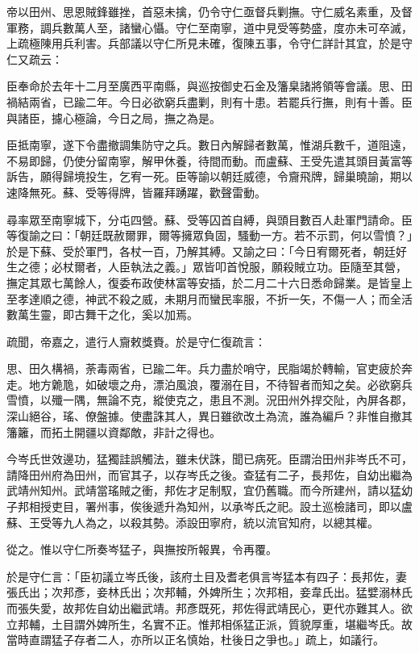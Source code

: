 \begin{pinyinscope}
帝以田州、思恩賊鋒雖挫，首惡未擒，仍令守仁亟督兵剿撫。守仁威名素重，及督軍務，調兵數萬人至，諸蠻心懾。守仁至南寧，道中見受等勢盛，度亦未可卒滅，上疏極陳用兵利害。兵部議以守仁所見未確，復陳五事，令守仁詳計其宜，於是守仁又疏云：

臣奉命於去年十二月至廣西平南縣，與巡按御史石金及籓臬諸將領等會議。思、田禍結兩省，已踰二年。今日必欲窮兵盡剿，則有十患。若罷兵行撫，則有十善。臣與諸臣，攄心極論，今日之局，撫之為是。

臣抵南寧，遂下令盡撤調集防守之兵。數日內解歸者數萬，惟湖兵數千，道阻遠，不易即歸，仍使分留南寧，解甲休養，待間而動。而盧蘇、王受先遣其頭目黃富等訴告，願得歸境投生，乞宥一死。臣等諭以朝廷威德，令齎飛牌，歸巢曉諭，期以速降無死。蘇、受等得牌，皆羅拜踴躍，歡聲雷動。

尋率眾至南寧城下，分屯四營。蘇、受等囚首自縛，與頭目數百人赴軍門請命。臣等復諭之曰：「朝廷既赦爾罪，爾等擁眾負固，騷動一方。若不示罰，何以雪憤？」於是下蘇、受於軍門，各杖一百，乃解其縛。又諭之曰：「今日宥爾死者，朝廷好生之德；必杖爾者，人臣執法之義。」眾皆叩首悅服，願殺賊立功。臣隨至其營，撫定其眾七萬餘人，復委布政使林富等安插，於二月二十六日悉命歸業。是皆皇上至孝達順之德，神武不殺之威，未期月而蠻民率服，不折一矢，不傷一人；而全活數萬生靈，即古舞干之化，奚以加焉。

疏聞，帝嘉之，遣行人齎敕獎賚。於是守仁復疏言：

思、田久構禍，荼毒兩省，已踰二年。兵力盡於哨守，民脂竭於轉輸，官吏疲於奔走。地方臲卼，如破壞之舟，漂泊風浪，覆溺在目，不待智者而知之矣。必欲窮兵雪憤，以殲一隅，無論不克，縱使克之，患且不測。況田州外捍交阯，內屏各郡，深山絕谷，瑤、僚盤據。使盡誅其人，異日雖欲改土為流，誰為編戶？非惟自撤其籓籬，而拓土開疆以資鄰敵，非計之得也。

今岑氏世效邊功，猛獨詿誤觸法，雖未伏誅，聞已病死。臣謂治田州非岑氏不可，請降田州府為田州，而官其子，以存岑氏之後。查猛有二子，長邦佐，自幼出繼為武靖州知州。武靖當瑤賊之衝，邦佐才足制馭，宜仍舊職。而今所建州，請以猛幼子邦相授吏目，署州事，俟後遞升為知州，以承岑氏之祀。設土巡檢諸司，即以盧蘇、王受等九人為之，以殺其勢。添設田寧府，統以流官知府，以總其權。

從之。惟以守仁所奏岑猛子，與撫按所報異，令再覆。

於是守仁言：「臣初議立岑氏後，該府土目及耆老俱言岑猛本有四子：長邦佐，妻張氏出；次邦彥，妾林氏出；次邦輔，外婢所生；次邦相，妾韋氏出。猛嬖溺林氏而張失愛，故邦佐自幼出繼武靖。邦彥既死，邦佐得武靖民心，更代亦難其人。欲立邦輔，土目謂外婢所生，名實不正。惟邦相係猛正派，質貌厚重，堪繼岑氏。故當時直謂猛子存者二人，亦所以正名慎始，杜後日之爭也。」疏上，如議行。


\end{pinyinscope}
